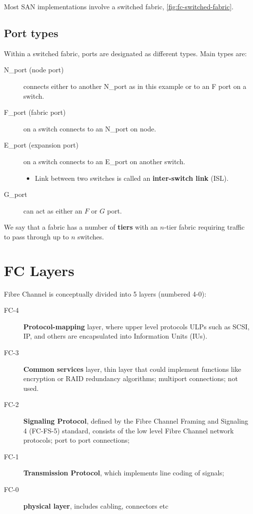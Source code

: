 \documentclass[slides]{pgnotes}
\begin{document}
Most SAN implementations involve a switched fabric, \autoref{fig:fc-switched-fabric}.


\subsection{Port types}

Within a switched fabric, ports are designated as different types. Main
types are:

\begin{description}
\item[N\_port (node port)]
connects either to another N\_port as in this example or to an F port on
a switch.
\item[F\_port (fabric port)]
on a switch connects to an N\_port on node.
\item[E\_port (expansion port)]
on a switch connects to an E\_port on another switch.

\begin{itemize}

\item
  Link between two switches is called an \textbf{inter-switch link}
  (ISL).
\end{itemize}
\item[G\_port]
can act as either an \(F\) or \(G\) port.
\end{description}

We say that a fabric has a number of \textbf{tiers} with an \(n\)-tier
fabric requiring traffic to pass through up to \(n\) switches.

\section{FC Layers}
\label{sec:fc-layers}

Fibre Channel is conceptually divided into 5 layers (numbered 4-0):
\begin{description}
\item[FC-4] \textbf{Protocol-mapping} layer, where upper level protocols ULPs such as SCSI, IP, and others are encapsulated into Information Units (IUs).
\item[FC-3] \textbf{Common services} layer, thin layer that could implement functions like encryption or RAID redundancy algorithms; multiport connections; not used.
\item[FC-2] \textbf{Signaling Protocol}, defined by the Fibre Channel Framing and Signaling 4 (FC-FS-5) standard, consists of the low level Fibre Channel network protocols; port to port connections;
\item[FC-1] \textbf{Transmission Protocol}, which implements line coding of signals;
\item[FC-0] \textbf{physical layer}, includes cabling, connectors etc
\end{description}
  
\end{document}
